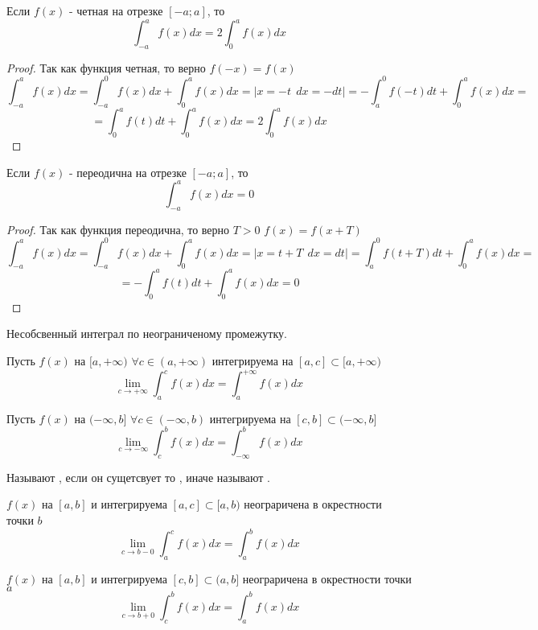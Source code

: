 \begin{theorem}
  Если $f(x)$ - четная на отрезке $[-a; a]$, то
  \[\int^a_{-a} f(x)dx = 2\int^a_{0} f(x)dx \]
\end{theorem}

\begin{proof}
  Так как функция четная, то верно $f(-x) = f(x)$
  \[\int^a_{-a} f(x)dx = \int^0_{-a} f(x)dx + \int^a_0 f(x)dx =
    |x = -t ~~ dx = -dt| = -\int^0_a f(-t)dt + \int^a_0 f(x)dx =\]
    \[= \int^a_0 f(t)dt + \int^a_0 f(x)dx = 2\int^a_{0} f(x)dx\]
\end{proof}

\begin{theorem}
  Если $f(x)$ - переодична на отрезке $[-a; a]$, то
  \[\int^a_{-a} f(x)dx = 0\]
\end{theorem}

\begin{proof}
  Так как функция переодична, то верно $T>0$ $f(x) = f(x+T)$
  \[\int^a_{-a} f(x)dx = \int^0_{-a} f(x)dx + \int^a_0 f(x)dx =
    |x = t+T ~~ dx = dt| = \int^0_a f(t+T)dt + \int^a_0 f(x)dx =\]
    \[= -\int^a_0 f(t)dt + \int^a_0 f(x)dx = 0\]
\end{proof}

\begin{title}[\Large]
    Несобсвенный интеграл по неограниченому промежутку.
\end{title}

\begin{defin}
    Пусть $f(x)$ на $[a,+\infty)$ $\forall c \in (a, +\infty)$ интегрируема
    на $[a,c] \subset [a, +\infty)$
    \[\lim_{c \to +\infty} \int_a^c f(x)dx = \int_a^{+\infty} f(x)dx\]
\end{defin}

\begin{defin}
    Пусть $f(x)$ на $(-\infty, b]$ $\forall c \in (-\infty, b)$ интегрируема
    на $[c,b] \subset (-\infty, b]$
    \[\lim_{c \to -\infty} \int_c^b f(x)dx = \int_{-\infty}^b f(x)dx\]
\end{defin}

Называют , если он сущетсвует то
, иначе называют .

\begin{defin}
    $f(x)$ на $[a,b]$ и интегрируема $[a,c] \subset [a,b)$ неограричена в
    окрестности точки $b$
    \[\lim_{c \to b -0} \int_a^c f(x)dx = \int_a^b f(x)dx\]
\end{defin}

\begin{defin}
    $f(x)$ на $[a,b]$ и интегрируема $[c,b] \subset (a,b]$ неограричена в
    окрестности точки $a$
    \[\lim_{c \to b +0} \int_c^b f(x)dx = \int_a^b f(x)dx\]
\end{defin}

